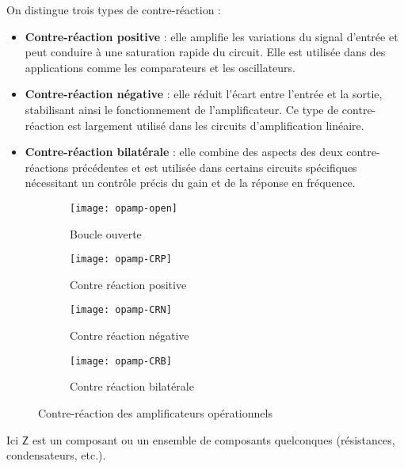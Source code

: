 On distingue trois types de contre-réaction :

\begin{itemize}
    \item \textbf{Contre-réaction positive} : elle amplifie les variations du signal d’entrée et peut conduire à une saturation rapide du circuit. Elle est utilisée dans des applications comme les comparateurs et les oscillateurs.
    \item \textbf{Contre-réaction négative} : elle réduit l’écart entre l’entrée et la sortie, stabilisant ainsi le fonctionnement de l’amplificateur. Ce type de contre-réaction est largement utilisé dans les circuits d’amplification linéaire.
    \item \textbf{Contre-réaction bilatérale} : elle combine des aspects des deux contre-réactions précédentes et est utilisée dans certains circuits spécifiques nécessitant un contrôle précis du gain et de la réponse en fréquence.
\end{itemize}

\begin{figure}[H]
    \begin{subfigure}[h]{0.49\textwidth}
        \centering
        \texttt{[image: opamp-open]}
        \caption{Boucle ouverte}
        \label{fig:opamp-open}
    \end{subfigure}
    \begin{subfigure}[h]{0.49\textwidth}
        \centering
        \texttt{[image: opamp-CRP]}
        \caption{Contre réaction positive}
        \label{fig:opamp-CRP}
    \end{subfigure}
    \vfill
    \begin{subfigure}[h]{0.49\textwidth}
        \centering
        \texttt{[image: opamp-CRN]}
        \caption{Contre réaction négative}
        \label{fig:opamp-CRN}
    \end{subfigure}
    \begin{subfigure}[h]{0.49\textwidth}
        \centering
        \texttt{[image: opamp-CRB]}
        \caption{Contre réaction bilatérale}
        \label{fig:opamp-CRB}
    \end{subfigure}
    \caption{Contre-réaction des amplificateurs opérationnels}
    \label{fig:opamp-CR}
\end{figure}

Ici \(\mathsf{Z}\) est un composant ou un ensemble de composants quelconques 
(résistances, condensateurs, etc.).

